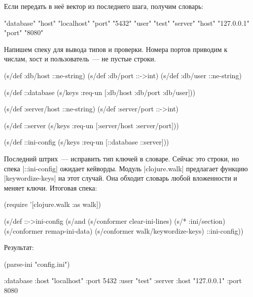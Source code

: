 \noindent
Если передать в не\"{е} вектор из последнего шага, получим словарь:

\begin{english}
  \begin{clojure}
{"database" {"host" "localhost" "port" "5432" "user" "test"}
 "server" {"host" "127.0.0.1" "port" "8080"}}
  \end{clojure}
\end{english}

Напишем спеку для вывода типов и проверки. Номера портов приводим к числам, хост
и пользователь~--- не пустые строки.

\begin{english}
  \begin{clojure}
(s/def :db/host ::ne-string)
(s/def :db/port ::->int)
(s/def :db/user ::ne-string)

(s/def ::database
  (s/keys :req-un [:db/host :db/port :db/user]))

(s/def :server/host ::ne-string)
(s/def :server/port ::->int)

(s/def ::server
  (s/keys :req-un [:server/host :server/port]))

(s/def ::ini-config
  (s/keys :req-un [::database ::server]))
  \end{clojure}
\end{english}


Последний штрих~--- исправить тип ключей в словаре. Сейчас это строки, но спека
\spverb|::ini-config| ожидает кейворды. Модуль \spverb|clojure.walk| предлагает
функцию \spverb|keywordize-keys| на этот случай. Она обходит словарь любой
вложенности и меняет ключи. Итоговая спека:

\begin{english}
  \begin{clojure}
(require '[clojure.walk :as walk])

(s/def ::->ini-config
  (s/and
   (s/conformer clear-ini-lines)
   (s/* :ini/section)
   (s/conformer remap-ini-data)
   (s/conformer walk/keywordize-keys)
   ::ini-config))
  \end{clojure}
\end{english}

\noindent
Результат:

\begin{english}
  \begin{clojure}
(parse-ini "config.ini")

{:database {:host "localhost"
            :port 5432
            :user "test"}
 :server {:host "127.0.0.1"
          :port 8080}}
  \end{clojure}
\end{english}

